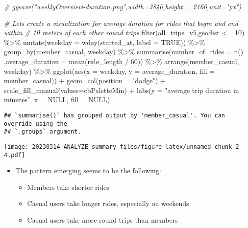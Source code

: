 \documentclass[
]{article}
\newenvironment{Shaded}{\begin{snugshade}}{\end{snugshade}}
\newcommand{\AttributeTok}[1]{\textcolor[rgb]{0.77,0.63,0.00}{#1}}
\newcommand{\CommentTok}[1]{\textcolor[rgb]{0.56,0.35,0.01}{\textit{#1}}}
\newcommand{\ConstantTok}[1]{\textcolor[rgb]{0.00,0.00,0.00}{#1}}
\newcommand{\DecValTok}[1]{\textcolor[rgb]{0.00,0.00,0.81}{#1}}
\newcommand{\FunctionTok}[1]{\textcolor[rgb]{0.00,0.00,0.00}{#1}}
\newcommand{\NormalTok}[1]{#1}
\newcommand{\SpecialCharTok}[1]{\textcolor[rgb]{0.00,0.00,0.00}{#1}}
\newcommand{\StringTok}[1]{\textcolor[rgb]{0.31,0.60,0.02}{#1}}
\providecommand{\tightlist}{%
  \setlength{\itemsep}{0pt}\setlength{\parskip}{0pt}}
\begin{document}
\begin{Shaded}
\begin{Highlighting}[]
\CommentTok{\# ggsave("weeklyOverview{-}duration.png",width=3840,height = 2160,unit="px")}

\CommentTok{\# Let\textquotesingle{}s create a visualization for average duration  for rides that begin and end within }
\CommentTok{\# 10 meters of each other \textquotesingle{}round trips\textquotesingle{}}
\FunctionTok{filter}\NormalTok{(all\_trips\_v5,geodist }\SpecialCharTok{\textless{}=} \DecValTok{10}\NormalTok{) }\SpecialCharTok{\%\textgreater{}\%} 
  \FunctionTok{mutate}\NormalTok{(}\AttributeTok{weekday =} \FunctionTok{wday}\NormalTok{(started\_at, }\AttributeTok{label =} \ConstantTok{TRUE}\NormalTok{)) }\SpecialCharTok{\%\textgreater{}\%} 
  \FunctionTok{group\_by}\NormalTok{(member\_casual, weekday) }\SpecialCharTok{\%\textgreater{}\%} 
  \FunctionTok{summarise}\NormalTok{(}\AttributeTok{number\_of\_rides =} \FunctionTok{n}\NormalTok{()}
\NormalTok{            ,}\AttributeTok{average\_duration =} \FunctionTok{mean}\NormalTok{(ride\_length }\SpecialCharTok{/} \DecValTok{60}\NormalTok{)) }\SpecialCharTok{\%\textgreater{}\%} 
  \FunctionTok{arrange}\NormalTok{(member\_casual, weekday)  }\SpecialCharTok{\%\textgreater{}\%} 
  \FunctionTok{ggplot}\NormalTok{(}\FunctionTok{aes}\NormalTok{(}\AttributeTok{x =}\NormalTok{ weekday, }\AttributeTok{y =}\NormalTok{ average\_duration, }\AttributeTok{fill =}\NormalTok{ member\_casual)) }\SpecialCharTok{+}
  \FunctionTok{geom\_col}\NormalTok{(}\AttributeTok{position =} \StringTok{"dodge"}\NormalTok{) }\SpecialCharTok{+} 
  \FunctionTok{scale\_fill\_manual}\NormalTok{(}\AttributeTok{values=}\NormalTok{cbPaletteMin) }\SpecialCharTok{+}
  \FunctionTok{labs}\NormalTok{(}\AttributeTok{y =} \StringTok{"average trip duration in minutes"}\NormalTok{, }\AttributeTok{x =} \ConstantTok{NULL}\NormalTok{, }\AttributeTok{fill =} \ConstantTok{NULL}\NormalTok{)}
\end{Highlighting}
\end{Shaded}

\begin{verbatim}
## `summarise()` has grouped output by 'member_casual'. You can override using the
## `.groups` argument.
\end{verbatim}

\texttt{[image: 20230314\_ANALYZE\_summary\_files/figure-latex/unnamed-chunk-2-4.pdf]}
\fontsize{10}{12} \selectfont

\begin{itemize}
\tightlist
\item
  The pattern emerging seems to be the following:

  \begin{itemize}
  \tightlist
  \item
    Members take shorter rides
  \item
    Casual users take longer rides, especially on weekends
  \item
    Casual users take more round trips than members
  \end{itemize}
\end{itemize}
\end{document}
